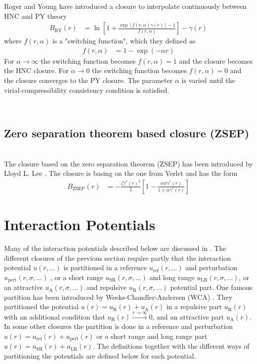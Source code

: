 Roger and Young have introduced a closure to interpolate continuously between HNC and PY
theory \cite{Rogers1984}
\begin{align}
B_\text{RY}(r) &= \ln
\left[1+\frac{\exp\left[f(r,\alpha)\gamma(r)\right]-1}{f(r,\alpha)}\right]-\gamma(r)
\end{align}
where $f(r,\alpha)$ is a "switching function", which they defined as
\begin{align}
f(r,\alpha) &= 1- \exp(-\alpha r)
\end{align}
For $\alpha \rightarrow \infty$ the switching function becomes $f(r,\alpha)=1$ and the
closure becomes the HNC closure.
For $\alpha \rightarrow 0$ the switching function becomes $f(r,\alpha)=0$ and the
closure converges to the PY closure. The parameter $\alpha$ is varied until the
virial-compressibility consistency condition is satisfied.

\vphantom{.}~\\
\subsection{Zero separation theorem based closure (ZSEP)}
~\\

The closure based on the zero separation theorem (ZSEP) has been introduced by
Lloyd L. Lee \cite{Lee1995,Lomba1996}. The closure is basing on the one from Verlet \cite{Verlet1980}
and has the form
\begin{align}
B_\text{ZSEP}(r) &= - \frac{\zeta \gamma^*(r)^2}{2}\left[ 1- \frac{\alpha\phi\gamma^*(r)}{1+\alpha\gamma^*(r)}\right]
\end{align}

\section{Interaction Potentials}

Many of the interaction potentials described below are discussed in \cite{Likos2001}.
The different closures of the previous section require partly that the interaction potential $u(r,\ldots)$
is partitioned in a reference $u_\text{ref}(r,\ldots)$ and perturbation $u_\text{pert}(r,\sigma,\ldots)$ ,
or a short range $u_\text{SR}(r,\sigma,\ldots)$
and long range $u_\text{LR}(r,\sigma,\ldots)$, or an attractive $u_\text{A}(r,\sigma,\ldots)$ and
repulsive $u_\text{R}(r,\sigma,\ldots)$ potential part.
One famous partition has been introduced by Weeks-Chandler-Andersen (WCA) \cite{Weeks1971}.
They partitioned the potential $u(r)=u_\text{R}(r)+u_\text{A}(r)$ in a repulsive part $u_\text{R}(r)$
with an additional condition that $u_\text{R}(r)  \xrightarrow{r\rightarrow\infty}0 $,
and an attractive part $u_\text{A}(r)$.
In some other closures the partition is done in a reference and perturbation $u(r)=u_\text{ref}(r)+u_\text{pert}(r)$
or a short range and long range part $u(r)=u_\text{SR}(r)+u_\text{LR}(r)$.
The definitions together with the different ways of partitioning the potentials are defined below for
each potential.

